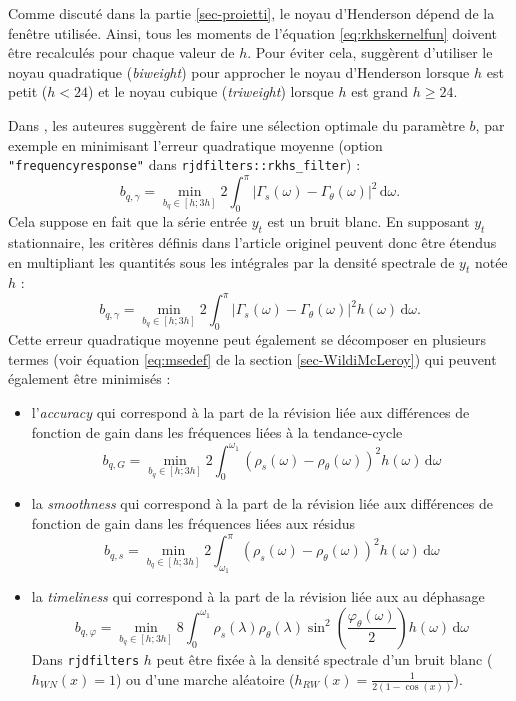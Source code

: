 \documentclass[
  11pt,
  french,
  a4paper]{article}
\newcommand\1{\mathds{1}}
\newcommand\ud{\,\mathrm{d}}
\begin{document}
Comme discuté dans la partie \ref{sec-proietti}, le noyau d'Henderson dépend de la fenêtre utilisée.
Ainsi, tous les moments de l'équation \eqref{eq:rkhskernelfun} doivent être recalculés pour chaque valeur de \(h\).
Pour éviter cela, \textcite{dagumbianconcini2008} suggèrent d'utiliser le noyau quadratique (\emph{biweight}) pour approcher le noyau d'Henderson lorsque \(h\) est petit (\(h< 24\)) et le noyau cubique (\emph{triweight}) lorsque \(h\) est grand \(h\geq 24\).

Dans \textcite{dagumbianconcini2015new}, les auteures suggèrent de faire une sélection optimale du paramètre \(b\), par exemple en minimisant l'erreur quadratique moyenne (option \texttt{"frequencyresponse"} dans \texttt{rjdfilters::rkhs\_filter}) :
\[
b_{q,\gamma}=\underset{b_q\in[h; 3h]}{\min}
2\int_{0}^{\pi}
\lvert \Gamma_s(\omega)-\Gamma_\theta(\omega)\rvert^2\ud \omega.
\]
Cela suppose en fait que la série entrée \(y_t\) est un bruit blanc.
En supposant \(y_t\) stationnaire, les critères définis dans l'article originel peuvent donc être étendus en multipliant les quantités sous les intégrales par la densité spectrale de \(y_t\) notée \(h\) :
\[
b_{q,\gamma}=\underset{b_q\in[h; 3h]}{\min}
2\int_{0}^{\pi}
\lvert \Gamma_s(\omega)-\Gamma_\theta(\omega)\rvert^2h(\omega)\ud \omega.
\]
Cette erreur quadratique moyenne peut également se décomposer en plusieurs termes (voir équation \eqref{eq:msedef} de la section \ref{sec-WildiMcLeroy}) qui peuvent également être minimisés :

\begin{itemize}
\item
  l'\emph{accuracy} qui correspond à la part de la révision liée aux différences de fonction de gain dans les fréquences liées à la tendance-cycle
  \[
  b_{q,G}=\underset{b_q\in[h; 3h]}{\min}
  2\int_{0}^{\omega_1}
  \left(\rho_s(\omega)-\rho_\theta(\omega)\right)^{2} h(\omega)\ud \omega
  \]
\item
  la \emph{smoothness} qui correspond à la part de la révision liée aux différences de fonction de gain dans les fréquences liées aux résidus
  \[
  b_{q,s}=\underset{b_q\in[h; 3h]}{\min}
  2\int_{\omega_1}^{\pi}
  \left(\rho_s(\omega)-\rho_\theta(\omega)\right)^{2} h(\omega)\ud \omega
  \]
\item
  la \emph{timeliness} qui correspond à la part de la révision liée aux au déphasage
  \[
  b_{q,\varphi}=\underset{b_q\in[h; 3h]}{\min}
  8\int_{0}^{\omega_1}
  \rho_s(\lambda)\rho_\theta(\lambda)\sin^{2}\left(\frac{\varphi_\theta(\omega)}{2}\right)h(\omega)\ud \omega
  \]
  Dans \texttt{rjdfilters} \(h\) peut être fixée à la densité spectrale d'un bruit blanc (\(h_{WN}(x)=1\)) ou d'une marche aléatoire (\(h_{RW}(x)=\frac{1}{2(1-\cos(x))}\)).
\end{itemize}
\end{document}

